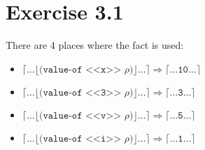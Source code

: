 \section*{Exercise 3.1}

There are 4 places where the fact is used:

\begin{itemize}
    \item$  \lceil \dots \lfloor
                \texttt{(value-of <<x>> $\rho$)}
            \rfloor \dots \rceil
         \Rightarrow
            \lceil \dots
                \texttt{10}
            \dots \rceil$
    \item$  \lceil \dots \lfloor
                \texttt{(value-of <<3>> $\rho$)}
            \rfloor \dots \rceil
         \Rightarrow
            \lceil \dots
                \texttt{3}
            \dots \rceil$
    \item$  \lceil \dots \lfloor
                \texttt{(value-of <<v>> $\rho$)}
            \rfloor \dots \rceil
         \Rightarrow
            \lceil \dots
                \texttt{5}
            \dots \rceil$
    \item$  \lceil \dots \lfloor
                \texttt{(value-of <<i>> $\rho$)}
            \rfloor \dots \rceil
         \Rightarrow
            \lceil \dots
                \texttt{1}
            \dots \rceil$

\end{itemize}


